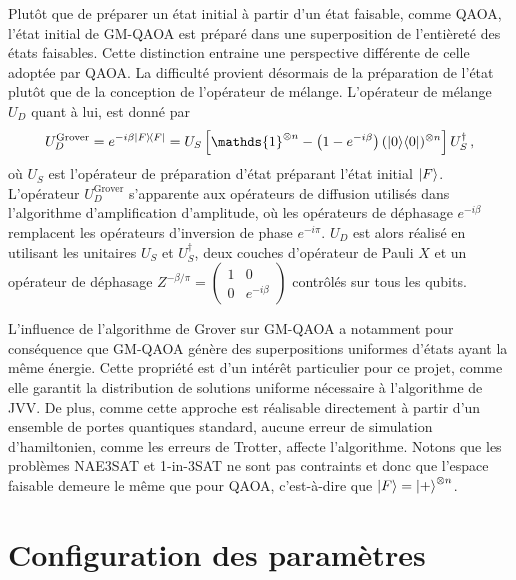 Plutôt que de préparer un état initial à partir d'un état faisable, comme QAOA, l'état initial de GM-QAOA est préparé dans une superposition de l'entièreté des états faisables. Cette distinction entraine une perspective différente de celle adoptée par QAOA. La difficulté provient désormais de la préparation de l'état plutôt que de la conception de l'opérateur de mélange. L'opérateur de mélange $U_{D}$ quant à lui, est donné par
\begin{equation}
    U_D^{\mathrm{Grover}} = e^{-i \beta \ket{F}\!\bra{F}} = U_{S}\left[ \mathds{1}^{\otimes n} -\left(1-e^{-i \beta}\right) (\ket{0}\!\bra{0})^{\otimes n} \right] U_{S}^{\dagger} \,,
\end{equation}
où $U_{S}$ est l'opérateur de préparation d'état préparant l'état initial $\ket{F}$. L'opérateur $U_{D}^{\mathrm{Grover}}$ s'apparente aux opérateurs de diffusion utilisés dans l'algorithme d'amplification d'amplitude, où les opérateurs de déphasage $e^{-i\beta}$ remplacent les opérateurs d'inversion de phase $e^{-i \pi}$. $U_{D}$ est alors réalisé en utilisant les unitaires $U_{S}$ et $U_{S}^{\dagger}$, deux couches d'opérateur de Pauli $X$ et un opérateur de déphasage $Z^{-\beta/\pi} = \begin{pmatrix}
1 & 0 \\
0 & e^{-i\beta}
\end{pmatrix}$ contrôlés sur tous les qubits.

L'influence de l'algorithme de Grover sur GM-QAOA a notamment pour conséquence que GM-QAOA génère des superpositions uniformes d'états ayant la même énergie. Cette propriété est d'un intérêt particulier pour ce projet, comme elle garantit la distribution de solutions uniforme nécessaire à l'algorithme de JVV. De plus, comme cette approche est réalisable directement à partir d'un ensemble de portes quantiques standard, aucune erreur de simulation d'hamiltonien, comme les erreurs de Trotter, affecte l'algorithme. Notons que les problèmes NAE3SAT et 1-in-3SAT ne sont pas contraints et donc que l'espace faisable demeure le même que pour QAOA, c'est-à-dire que $\ket{F} = \ket{+}^{\otimes n}$.


\section{Configuration des paramètres}
\label{subsec:configuration-des-parametres}

